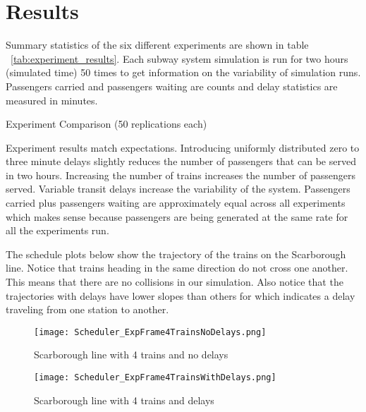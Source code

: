 \section{Results}

Summary statistics of the six different experiments are shown in table
~\ref{tab:experiment_results}. Each subway system simulation is run for two
hours (simulated time) 50 times to get information on the variability of
simulation runs. Passengers carried and passengers waiting are counts and 
delay statistics are measured in minutes.

\begin{sidewaystable}
    \centering
    \caption{Experiment Comparison (50 replications each)}
    \label{tab:experiment_results}
\end{sidewaystable}

Experiment results match expectations. Introducing uniformly distributed zero
to three minute delays slightly reduces the number of passengers that can be 
served in two hours. Increasing the number of trains increases the number of 
passengers served. Variable transit delays increase the variability of the system.
Passengers carried plus passengers waiting are approximately equal across all
experiments which makes sense because passengers are being generated at the
same rate for all the experiments run.

The schedule plots below show the trajectory of the trains on the Scarborough
line. Notice that trains heading in the same direction do not cross one
another. This means that there are no collisions in our simulation. Also notice
that the trajectories with delays have lower slopes than others for which
indicates a delay traveling from one station to another.

\begin{figure}[tb]
	\centering
	\texttt{[image: Scheduler\_ExpFrame4TrainsNoDelays.png]}
	\caption{Scarborough line with 4 trains and no delays}\label{fig:4trainsNoDelay}
\end{figure}

\begin{figure}[tb]
	\centering
	\texttt{[image: Scheduler\_ExpFrame4TrainsWithDelays.png]}
	\caption{Scarborough line with 4 trains and delays}\label{fig:4trainsWithDelay}
\end{figure}

